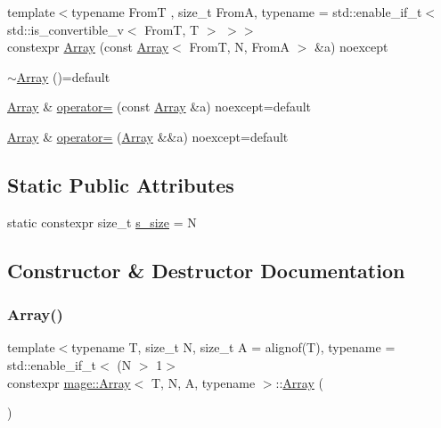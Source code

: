 \begin{DoxyCompactItemize}
\item 
{\footnotesize template$<$typename FromT , size\+\_\+t FromA, typename  = std\+::enable\+\_\+if\+\_\+t$<$ std\+::is\+\_\+convertible\+\_\+v$<$ From\+T, T $>$ $>$$>$ }\\constexpr \mbox{\hyperlink{structmage_1_1_array_a950b26208c3546704f42e92c312a93ed}{Array}} (const \mbox{\hyperlink{structmage_1_1_array}{Array}}$<$ FromT, N, FromA $>$ \&a) noexcept
\item 
\mbox{\hyperlink{structmage_1_1_array_a7adc09166915789b93a7a3af118182e0}{$\sim$\+Array}} ()=default
\item 
\mbox{\hyperlink{structmage_1_1_array}{Array}} \& \mbox{\hyperlink{structmage_1_1_array_a216d8efaf044c3219a45e53073833ee0}{operator=}} (const \mbox{\hyperlink{structmage_1_1_array}{Array}} \&a) noexcept=default
\item 
\mbox{\hyperlink{structmage_1_1_array}{Array}} \& \mbox{\hyperlink{structmage_1_1_array_a33cb0dac90d7bf6c3973455ab12eb535}{operator=}} (\mbox{\hyperlink{structmage_1_1_array}{Array}} \&\&a) noexcept=default
\end{DoxyCompactItemize}
\subsection*{Static Public Attributes}
\begin{DoxyCompactItemize}
\item 
static constexpr size\+\_\+t \mbox{\hyperlink{structmage_1_1_array_aead6104ec6173aed5755a261b0a82b82}{s\+\_\+size}} = N
\end{DoxyCompactItemize}


\subsection{Constructor \& Destructor Documentation}
\mbox{\label{structmage_1_1_array_ac1cf5733c005dfb79fb9e5e736098598}} 
\subsubsection{\texorpdfstring{Array()}{Array()}\hspace{0.1cm}{\footnotesize\ttfamily [1/10]}}
{\footnotesize\ttfamily template$<$typename T, size\+\_\+t N, size\+\_\+t A = alignof(\+T), typename  = std\+::enable\+\_\+if\+\_\+t$<$ (\+N $>$ 1$>$ \\
constexpr \mbox{\hyperlink{structmage_1_1_array}{mage\+::\+Array}}$<$ T, N, A, typename $>$\+::\mbox{\hyperlink{structmage_1_1_array}{Array}} (\begin{DoxyParamCaption}{ }\end{DoxyParamCaption})\hspace{0.3cm}{\ttfamily [noexcept]}}

